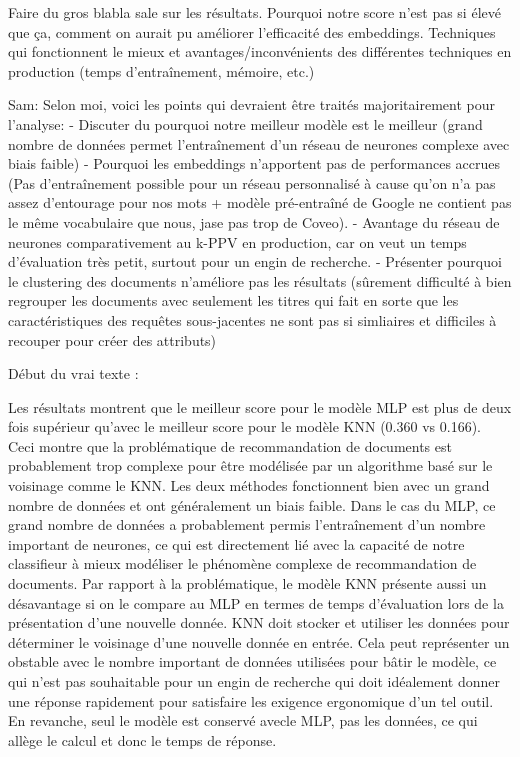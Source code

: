 Faire du gros blabla sale sur les résultats. Pourquoi notre score n'est pas si élevé que ça, comment on aurait pu améliorer l'efficacité des embeddings. Techniques qui fonctionnent le mieux et avantages/inconvénients des différentes techniques en production (temps d'entraînement, mémoire, etc.)

Sam: Selon moi, voici les points qui devraient être traités majoritairement pour l'analyse:
	- Discuter du pourquoi notre meilleur modèle est le meilleur (grand nombre de données permet l'entraînement d'un réseau de neurones complexe avec biais faible)
	- Pourquoi les embeddings n'apportent pas de performances accrues (Pas d'entraînement possible pour un réseau personnalisé à cause qu'on n'a pas assez d'entourage pour nos mots + modèle pré-entraîné de Google ne contient pas le même vocabulaire que nous, jase pas trop de Coveo).
	- Avantage du réseau de neurones comparativement au k-PPV en production, car on veut un temps d'évaluation très petit, surtout pour un engin de recherche.
	- Présenter pourquoi le clustering des documents n'améliore pas les résultats (sûrement difficulté à bien regrouper les documents avec seulement les titres qui fait en sorte que les caractéristiques des requêtes sous-jacentes ne sont pas si simliaires et difficiles à recouper pour créer des attributs)
\break

Début du vrai texte :
\break

Les résultats montrent que le meilleur score pour le modèle MLP est plus de deux fois supérieur qu'avec le meilleur score pour le modèle KNN (0.360 vs 0.166). Ceci montre que la problématique de recommandation de documents est probablement trop complexe pour être modélisée par un algorithme basé sur le voisinage comme le KNN. Les deux méthodes fonctionnent  bien avec un grand nombre de données et ont généralement un biais faible. Dans le cas du MLP, ce grand nombre de données a probablement permis l'entraînement d'un nombre important de neurones, ce qui est directement lié avec la capacité de notre classifieur à mieux modéliser le phénomène complexe de recommandation de documents. Par rapport à la problématique, le modèle KNN présente aussi un désavantage si on le compare au MLP en termes de temps d'évaluation lors de la présentation d'une nouvelle donnée. KNN doit stocker et utiliser les données pour déterminer le voisinage d'une nouvelle donnée en entrée. Cela peut représenter un obstable avec le nombre important de données utilisées pour bâtir le modèle, ce qui n'est pas souhaitable pour un engin de recherche qui doit idéalement donner une réponse rapidement pour satisfaire les exigence ergonomique d'un tel outil. En revanche, seul le modèle est conservé avecle MLP, pas les données, ce qui allège le calcul et donc le temps de réponse.
\break

